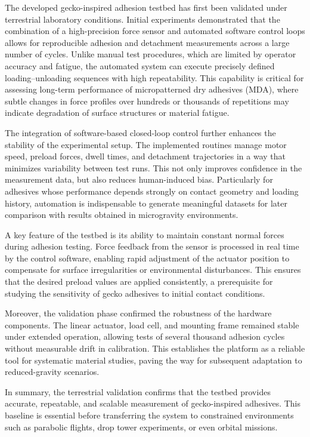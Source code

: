 \documentclass[
    twocolumn,
    fontsize = 10pt,
    parskip = half+,
    headings = small,
    headwidth = text,
    footwidth = text,
]{scrartcl}
\begin{document}
The developed gecko-inspired adhesion testbed has first been validated under terrestrial laboratory conditions. 
Initial experiments demonstrated that the combination of a high-precision force sensor and automated software control loops 
allows for reproducible adhesion and detachment measurements across a large number of cycles. 
Unlike manual test procedures, which are limited by operator accuracy and fatigue, the automated system can execute 
precisely defined loading–unloading sequences with high repeatability. 
This capability is critical for assessing long-term performance of micropatterned dry adhesives (MDA), 
where subtle changes in force profiles over hundreds or thousands of repetitions may indicate degradation of surface structures or material fatigue.  

The integration of software-based closed-loop control further enhances the stability of the experimental setup. 
The implemented routines manage motor speed, preload forces, dwell times, and detachment trajectories in a way that minimizes variability between test runs. 
This not only improves confidence in the measurement data, but also reduces human-induced bias. 
Particularly for adhesives whose performance depends strongly on contact geometry and loading history, 
automation is indispensable to generate meaningful datasets for later comparison with results obtained in microgravity environments.  

A key feature of the testbed is its ability to maintain constant normal forces during adhesion testing. 
Force feedback from the sensor is processed in real time by the control software, 
enabling rapid adjustment of the actuator position to compensate for surface irregularities or environmental disturbances. 
This ensures that the desired preload values are applied consistently, a prerequisite for studying the sensitivity of gecko adhesives to initial contact conditions.  

Moreover, the validation phase confirmed the robustness of the hardware components. 
The linear actuator, load cell, and mounting frame remained stable under extended operation, 
allowing tests of several thousand adhesion cycles without measurable drift in calibration. 
This establishes the platform as a reliable tool for systematic material studies, paving the way for subsequent adaptation to reduced-gravity scenarios.  

In summary, the terrestrial validation confirms that the testbed provides accurate, repeatable, and scalable measurement of gecko-inspired adhesives. 
This baseline is essential before transferring the system to constrained environments such as parabolic flights, drop tower experiments, or even orbital missions.
\end{document}
